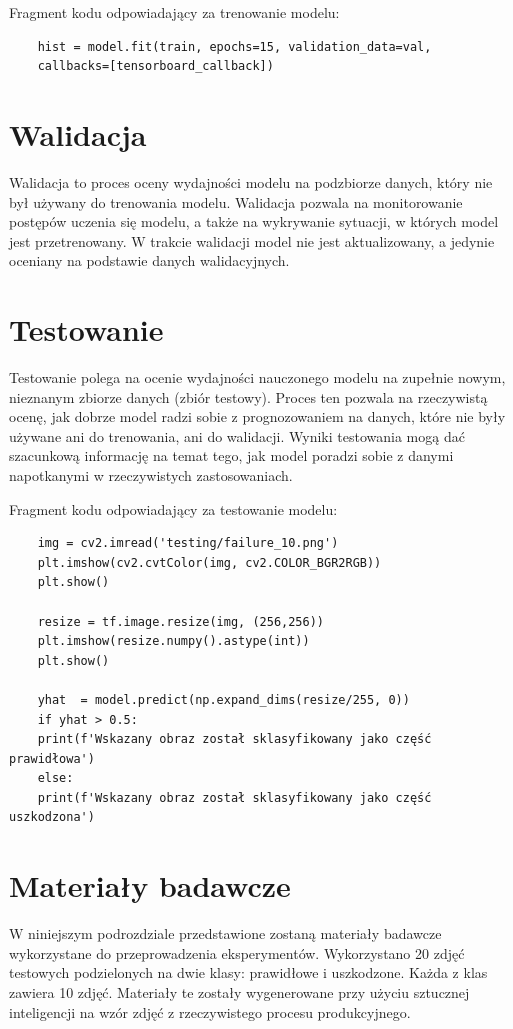 Fragment kodu odpowiadający za trenowanie modelu:

\begin{verbatim}
    hist = model.fit(train, epochs=15, validation_data=val, 
    callbacks=[tensorboard_callback])
\end{verbatim}

\section{Walidacja}
Walidacja to proces oceny wydajności modelu na podzbiorze danych, który nie był używany do trenowania modelu. Walidacja pozwala na monitorowanie postępów uczenia się modelu, a także na wykrywanie sytuacji, w których model jest przetrenowany. W trakcie walidacji model nie jest aktualizowany, a jedynie oceniany na podstawie danych walidacyjnych.

\section{Testowanie}
Testowanie polega na ocenie wydajności nauczonego modelu na zupełnie nowym, nieznanym zbiorze danych (zbiór testowy). Proces ten pozwala na rzeczywistą ocenę, jak dobrze model radzi sobie z prognozowaniem na danych, które nie były używane ani do trenowania, ani do walidacji. Wyniki testowania mogą dać szacunkową informację na temat tego, jak model poradzi sobie z danymi napotkanymi w rzeczywistych zastosowaniach.

Fragment kodu odpowiadający za testowanie modelu:

\begin{verbatim}
    img = cv2.imread('testing/failure_10.png')
    plt.imshow(cv2.cvtColor(img, cv2.COLOR_BGR2RGB))
    plt.show()

    resize = tf.image.resize(img, (256,256))
    plt.imshow(resize.numpy().astype(int))
    plt.show()

    yhat  = model.predict(np.expand_dims(resize/255, 0))
    if yhat > 0.5:
    print(f'Wskazany obraz został sklasyfikowany jako część prawidłowa')
    else:
    print(f'Wskazany obraz został sklasyfikowany jako część uszkodzona')
\end{verbatim}

\section{Materiały badawcze}

W niniejszym podrozdziale przedstawione zostaną materiały badawcze wykorzystane do przeprowadzenia eksperymentów. Wykorzystano 20 zdjęć testowych podzielonych na dwie klasy: prawidłowe i uszkodzone. Każda z klas zawiera 10 zdjęć. Materiały te zostały wygenerowane przy użyciu sztucznej inteligencji na wzór zdjęć z rzeczywistego procesu produkcyjnego.


